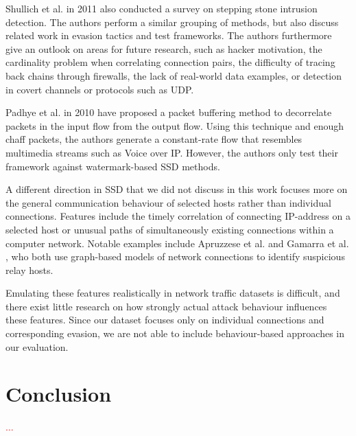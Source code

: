 \documentclass[runningheads]{llncs}\usepackage[]{graphicx}\usepackage[]{color}
\begin{document}
Shullich et al. \cite{shullich2011survey} in 2011 also conducted a survey on stepping stone intrusion detection. The authors perform a similar grouping of methods, but also discuss related work in evasion tactics and test frameworks. The authors furthermore give an outlook on areas for future research, such as hacker motivation, the cardinality problem when correlating connection pairs, the difficulty of tracing back chains through firewalls, the lack of real-world data examples, or detection in covert channels or protocols such as UDP.  

Padhye et al. \cite{padhye2010evading} in 2010 have proposed a packet buffering method to decorrelate packets in the input flow from the output flow. Using this technique and enough chaff packets, the authors generate a constant-rate flow that resembles multimedia streams such as Voice over IP. However, the authors only test their framework against watermark-based SSD methods. 






A different direction in SSD that we did not discuss in this work focuses more on the general communication behaviour of selected hosts rather than individual connections. Features include the timely correlation of connecting IP-address on a selected host or unusual paths of simultaneously existing connections within a computer network. Notable examples include Apruzzese et al. \cite{apruzzese2017detection} and Gamarra et al. \cite{gamarra2018analysis}, who both use graph-based models of network connections to identify suspicious relay hosts.

Emulating these features realistically in network traffic datasets is difficult, and there exist little research on how strongly actual attack behaviour influences these features. Since our dataset focuses only on individual connections and corresponding evasion, we are not able to include behaviour-based approaches in our evaluation.




\section{Conclusion}

\textcolor{red}{...}

%



\appendix




 
\end{document}
